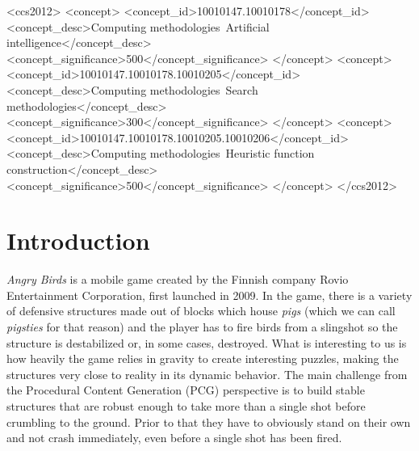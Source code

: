 \documentclass[sigconf]{acmart}
\begin{document}
 \begin{CCSXML}
<ccs2012>
<concept>
<concept_id>10010147.10010178</concept_id>
<concept_desc>Computing methodologies~Artificial intelligence</concept_desc>
<concept_significance>500</concept_significance>
</concept>
<concept>
<concept_id>10010147.10010178.10010205</concept_id>
<concept_desc>Computing methodologies~Search methodologies</concept_desc>
<concept_significance>300</concept_significance>
</concept>
<concept>
<concept_id>10010147.10010178.10010205.10010206</concept_id>
<concept_desc>Computing methodologies~Heuristic function 
construction</concept_desc>
<concept_significance>500</concept_significance>
</concept>
</ccs2012>
\end{CCSXML}




\maketitle

%
%
\section{Introduction}
\label{sec:intro}

\textit{Angry Birds} is a mobile game created by the Finnish company Rovio 
Entertainment 
Corporation\cite{angry-birds}, first launched in 2009. 
In the game, there is a variety of defensive structures made out of
blocks which house {\em pigs} (which we can call {\em pigsties} for
that reason)
and the player has to fire birds from a slingshot
so the structure is destabilized or, in some cases, destroyed.
What is interesting to us is how heavily the 
game relies in gravity to create interesting puzzles, making the
structures very close to reality in its dynamic behavior. The main challenge 
from 
the Procedural Content Generation (PCG) perspective is to build stable
structures that are robust enough to take more than a single shot
before crumbling to the ground. Prior to that they have to obviously
stand on their own and not crash immediately, even before a single
shot has been fired.
\end{document}

